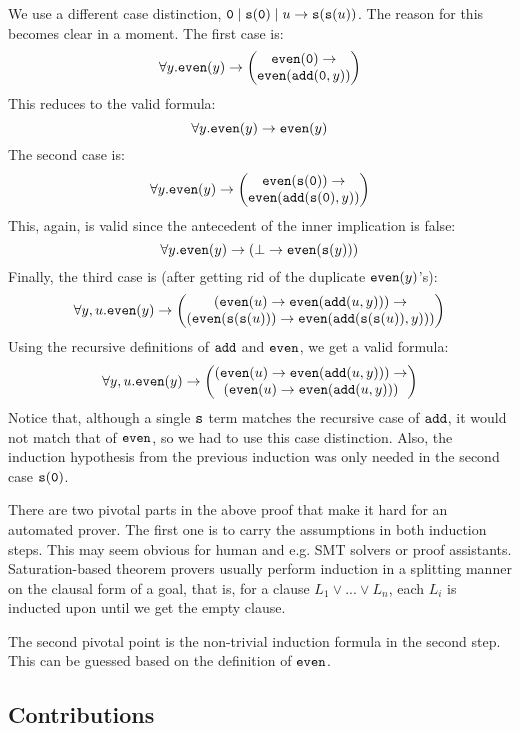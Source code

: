 \begin{example}
	We use a different case distinction, $\mathtt{0}\mid\mathtt{s}(\mathtt{0})\mid u\rightarrow\mathtt{s}(\mathtt{s}(u))$. The reason for this becomes clear in a moment. The first case is:
	$$\forall y. \mathtt{even}(y)\rightarrow\begin{pmatrix}\mathtt{even}(\mathtt{0})\rightarrow\\
	\mathtt{even}(\mathtt{add}(\mathtt{0},y))\end{pmatrix}$$
	This reduces to the valid formula:
	$$\forall y. \mathtt{even}(y)\rightarrow\mathtt{even}(y)$$
	The second case is:
	$$\forall y. \mathtt{even}(y)\rightarrow\begin{pmatrix}\mathtt{even}(\mathtt{s}(\mathtt{0}))\rightarrow\\
	\mathtt{even}(\mathtt{add}(\mathtt{s}(\mathtt{0}),y))\end{pmatrix}$$
	This, again, is valid since the antecedent of the inner implication is false:
	$$\forall y. \mathtt{even}(y)\rightarrow(\bot\rightarrow\mathtt{even}(\mathtt{s}(y)))$$
	Finally, the third case is (after getting rid of the duplicate $\mathtt{even}(y)$'s):
	$$\forall y,u. \mathtt{even}(y)\rightarrow\begin{pmatrix}(\mathtt{even}(u)\rightarrow\mathtt{even}(\mathtt{add}(u,y)))\rightarrow\\
	(\mathtt{even}(\mathtt{s}(\mathtt{s}(u)))\rightarrow\mathtt{even}(\mathtt{add}(\mathtt{s}(\mathtt{s}(u)),y)))\end{pmatrix}$$
	Using the recursive definitions of $\mathtt{add}$ and $\mathtt{even}$, we get a valid formula:
	$$\forall y,u. \mathtt{even}(y)\rightarrow\begin{pmatrix}(\mathtt{even}(u)\rightarrow\mathtt{even}(\mathtt{add}(u,y)))\rightarrow\\
	(\mathtt{even}(u)\rightarrow\mathtt{even}(\mathtt{add}(u,y)))\end{pmatrix}$$
	Notice that, although a single $\mathtt{s}$ term matches the recursive case of $\mathtt{add}$, it would not match that of $\mathtt{even}$, so we had to use this case distinction. Also, the induction hypothesis from the previous induction was only needed in the second case $\mathtt{s}(\mathtt{0})$.
\end{example}

There are two pivotal parts in the above proof that make it hard for an automated prover. The first one is to carry the assumptions in both induction steps. This may seem obvious for human and e.g. SMT solvers or proof assistants. Saturation-based theorem provers usually perform induction in a splitting manner on the clausal form of a goal, that is, for a clause $L_1\lor...\lor L_n$, each $L_i$ is inducted upon until we get the empty clause.

The second pivotal point is the non-trivial induction formula in the second step. This can be guessed based on the definition of $\mathtt{even}$.

\subsection{Contributions}

